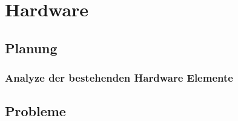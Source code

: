 \section{Hardware}
\subsection{Planung}
\subsubsection{Analyze der bestehenden Hardware Elemente}
\subsection{Probleme}